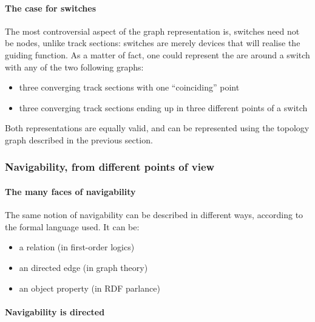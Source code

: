 \documentclass[
  11pt,
]{article}
\providecommand{\tightlist}{%
  \setlength{\itemsep}{0pt}\setlength{\parskip}{0pt}}
\begin{document}
\hypertarget{the-case-for-switches}{%
\paragraph{The case for switches}\label{the-case-for-switches}}

The most controversial aspect of the graph representation is, switches
need not be nodes, unlike track sections: switches are merely devices
that will realise the guiding function. As a matter of fact, one could
represent the are around a switch with any of the two following graphs:

\begin{itemize}
\tightlist
\item
  three converging track sections with one ``coinciding'' point
\item
  three converging track sections ending up in three different points of
  a switch
\end{itemize}

Both representations are equally valid, and can be represented using the
topology graph described in the previous section.

\hypertarget{navigability-from-different-points-of-view}{%
\subsubsection{Navigability, from different points of
view}\label{navigability-from-different-points-of-view}}

\hypertarget{the-many-faces-of-navigability}{%
\paragraph{The many faces of
navigability}\label{the-many-faces-of-navigability}}

The same notion of navigability can be described in different ways,
according to the formal language used. It can be:

\begin{itemize}
\tightlist
\item
  a relation (in first-order logics)
\item
  an directed edge (in graph theory)
\item
  an object property (in RDF parlance)
\end{itemize}

\hypertarget{navigability-is-directed}{%
\paragraph{Navigability is directed}\label{navigability-is-directed}}
\end{document}
